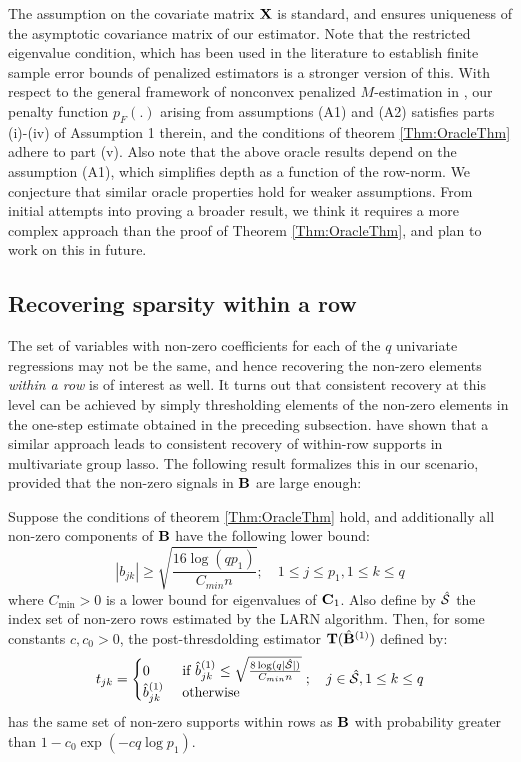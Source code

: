 The assumption on the covariate matrix ${\mathbf{X}}$ is standard, and ensures uniqueness of the asymptotic covariance matrix of our estimator. Note that the restricted eigenvalue condition, which has been used in the literature to establish finite sample error bounds of penalized estimators \citep{NeghabanEtal09} is a stronger version of this. With respect to the general framework of nonconvex penalized $M$-estimation in \cite{LohWainwright15}, our penalty function $p_F(.)$ arising from assumptions (A1) and (A2) satisfies parts (i)-(iv) of Assumption 1 therein, and the conditions of theorem \ref{Thm:OracleThm} adhere to part (v). Also note that the above oracle results depend on the assumption (A1), which simplifies depth as a function of the row-norm. We conjecture that similar oracle properties hold for weaker assumptions. From initial attempts into proving a broader result, we think it requires a more complex approach than the proof of Theorem \ref{Thm:OracleThm}, and plan to work on this in future.

\subsection{Recovering sparsity within a row}

The set of variables with non-zero coefficients for each of the $q$ univariate regressions may not be the same, and hence recovering the non-zero elements \textit{within a row} is of interest as well. It turns out that consistent recovery at this level can be achieved by simply thresholding elements of the non-zero elements in the one-step estimate obtained in the preceding subsection. \cite{ObozinskiEtal11} have shown that a similar approach leads to consistent recovery of within-row supports in multivariate group lasso. The following result formalizes this in our scenario, provided that the non-zero signals in ${\mathbf{B}}$ are large enough:

\begin{Lemma}\label{Thm:RowSupportThm}
Suppose the conditions of theorem \ref{Thm:OracleThm} hold, and additionally all non-zero components of ${\mathbf{B}}$ have the following lower bound:
%
$$
| b_{jk} | \geq \sqrt{\frac{16 \log (q p_1) }{C_{min} n}}; \quad 1 \leq j \leq p_1, 1 \leq k \leq q
$$
%
where $C_{\min} > 0$ is a lower bound for eigenvalues of ${\mathbf{C}}_1$. Also define by $\hat {{\cal{S}}}$ the index set of non-zero rows estimated by the LARN algorithm. Then, for some constants $c, c_0 > 0$, the post-thresdolding estimator ${\mathbf{T}} (\hat{{\mathbf{B}}}^{(1)})$ defined by:
%
$$
t_{jk} = \begin{cases} 0 & \text{ if } \hat b_{jk}^{(1)} \leq  \sqrt{\frac{8 \log (q|\hat {{\cal{S}}}|) }{C_{min} n}}\\
 \hat b_{jk}^{(1)} & \text{ otherwise }
\end{cases}
; \quad j \in \hat {{\cal{S}}}, 1 \leq k \leq q
$$
%
has the same set of non-zero supports within rows as ${\mathbf{B}}$ with probability greater than $1 - c_0 \exp( - c q \log p_1)$.

\end{Lemma}

